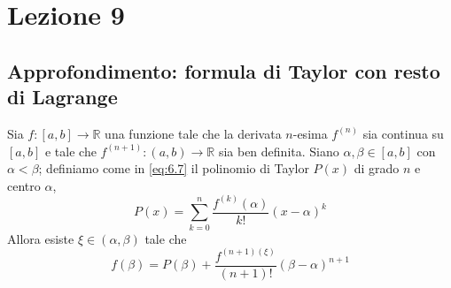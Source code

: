 \section{Lezione 9}
\subsection{Approfondimento: formula di Taylor con resto di Lagrange}
\begin{theorem}
    \label{th:9n.1}
    Sia $f\colon[a,b]\to\mathbb{R}$ una funzione tale che la derivata $n$-esima $f^{(n)}$ sia continua su $[a,b]$ e tale che $f^{(n+1)}\colon(a,b)\to \mathbb{R}$ sia ben definita. Siano $\alpha, \beta\in[a,b]$ con $\alpha<\beta$; definiamo come in \eqref{eq:6.7} il polinomio di Taylor $P(x)$ di grado $n$ e centro $\alpha$,
    \[
    P(x) = \sum_{k=0}^n \frac{f^{(k)}(\alpha)}{k!}(x-\alpha)^k
    \]
    Allora esiste $\xi\in(\alpha, \beta)$ tale che 
    \[
    f(\beta) = P(\beta)+\frac{f^{(n+1)(\xi)}}{(n+1)!}(\beta-\alpha)^{n+1}
    \]
\end{theorem}
